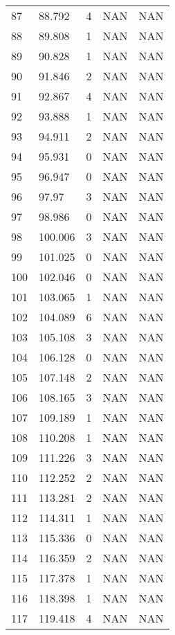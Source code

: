 \documentclass{article}
\begin{document}
\begin{longtable}{@{}lllll@{}}
				87  & 88.792  & 4     & NAN   & NAN   \\
				88  & 89.808  & 1     & NAN   & NAN   \\
				89  & 90.828  & 1     & NAN   & NAN   \\
				90  & 91.846  & 2     & NAN   & NAN   \\
				91  & 92.867  & 4     & NAN   & NAN   \\
				92  & 93.888  & 1     & NAN   & NAN   \\
				93  & 94.911  & 2     & NAN   & NAN   \\
				94  & 95.931  & 0     & NAN   & NAN   \\
				95  & 96.947  & 0     & NAN   & NAN   \\
				96  & 97.97   & 3     & NAN   & NAN   \\
				97  & 98.986  & 0     & NAN   & NAN   \\
				98  & 100.006 & 3     & NAN   & NAN   \\
				99  & 101.025 & 0     & NAN   & NAN   \\
				100 & 102.046 & 0     & NAN   & NAN   \\
				101 & 103.065 & 1     & NAN   & NAN   \\
				102 & 104.089 & 6     & NAN   & NAN   \\
				103 & 105.108 & 3     & NAN   & NAN   \\
				104 & 106.128 & 0     & NAN   & NAN   \\
				105 & 107.148 & 2     & NAN   & NAN   \\
				106 & 108.165 & 3     & NAN   & NAN   \\
				107 & 109.189 & 1     & NAN   & NAN   \\
				108 & 110.208 & 1     & NAN   & NAN   \\
				109 & 111.226 & 3     & NAN   & NAN   \\
				110 & 112.252 & 2     & NAN   & NAN   \\
				111 & 113.281 & 2     & NAN   & NAN   \\
				112 & 114.311 & 1     & NAN   & NAN   \\
				113 & 115.336 & 0     & NAN   & NAN   \\
				114 & 116.359 & 2     & NAN   & NAN   \\
				115 & 117.378 & 1     & NAN   & NAN   \\
				116 & 118.398 & 1     & NAN   & NAN   \\
				117 & 119.418 & 4     & NAN   & NAN   \\

\end{longtable}
\end{document}
